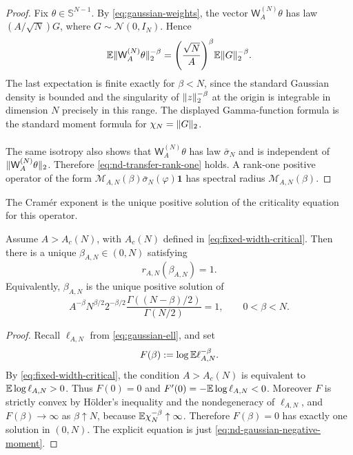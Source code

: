 \documentclass[11pt,reqno,a4paper]{article}
\newcommand{\Ee}{\E}
\begin{document}
\begin{proof}
  Fix $\theta\in\mathbb S^{N-1}$. By
  \cref{eq:gaussian-weights}, the vector
  $\mathsf W_A^{(N)}\theta$ has law $(A/\sqrt N)G$, where
  $G\sim\mathcal N(0,I_N)$. Hence
  \begin{equation*}
    \Ee\norm{\mathsf W_A^{(N)}\theta}_2^{-\beta}
    =
    \left(\frac{\sqrt N}{A}\right)^\beta
    \Ee\norm{G}_2^{-\beta}.
  \end{equation*}
  The last expectation is finite exactly for $\beta<N$, since the standard
  Gaussian density is bounded and the singularity of $\lVert z\rVert_2^{-\beta}$ at
  the origin is integrable in dimension $N$ precisely in this range. The
  displayed Gamma-function formula is the standard moment formula for
  $\chi_N=\lVert G\rVert_2$.

  The same isotropy also shows that
  $\widehat{\mathsf W_A^{(N)}\theta}$ has law $\bar\sigma_N$ and is independent
  of $\lVert\mathsf W_A^{(N)}\theta\rVert_2$. Therefore
  \cref{eq:nd-transfer-rank-one} holds. A rank-one positive operator of the
  form $\mathcal M_{A,N}(\beta)\bar\sigma_N(\varphi)\mathbf 1$ has spectral
  radius $\mathcal M_{A,N}(\beta)$.
\end{proof}

The Cramér exponent is the unique positive solution of the criticality equation
for this operator.
\begin{lemma}\label{lem:nd-gaussian-cramer-exponent}
  Assume $A>A_c(N)$, with $A_c(N)$ defined in
  \cref{eq:fixed-width-critical}. Then there is a unique
  $\beta_{A,N}\in(0,N)$ satisfying
  \begin{equation}\label{eq:nd-beta-equation}
    r_{A,N}(\beta_{A,N})=1.
  \end{equation}
  Equivalently, $\beta_{A,N}$ is the unique positive solution of
  \begin{equation}\label{eq:nd-beta-equation-explicit}
    A^{-\beta}
    N^{\beta/2}
    2^{-\beta/2}
    \frac{\Gamma((N-\beta)/2)}{\Gamma(N/2)}
    =
    1,
    \qquad 0<\beta<N.
  \end{equation}
\end{lemma}

\begin{proof}
  Recall $\ell_{A,N}$ from \cref{eq:gaussian-ell}, and set
  \begin{equation*}
    F(\beta):=\log\Ee \ell_{A,N}^{-\beta}.
  \end{equation*}
  By \cref{eq:fixed-width-critical}, the condition $A>A_c(N)$ is equivalent to
  $\Ee\log \ell_{A,N}>0$. Thus $F(0)=0$ and
  $F'(0)=-\Ee\log \ell_{A,N}<0$.
  Moreover $F$ is strictly convex by H\"older's inequality and the
  nondegeneracy of $\ell_{A,N}$, and
  $F(\beta)\to\infty$ as $\beta\uparrow N$, because
  $\Ee\chi_N^{-\beta}\uparrow\infty$. Therefore $F(\beta)=0$ has exactly one
  solution in $(0,N)$. The explicit equation is just
  \cref{eq:nd-gaussian-negative-moment}.
\end{proof}
\end{document}
